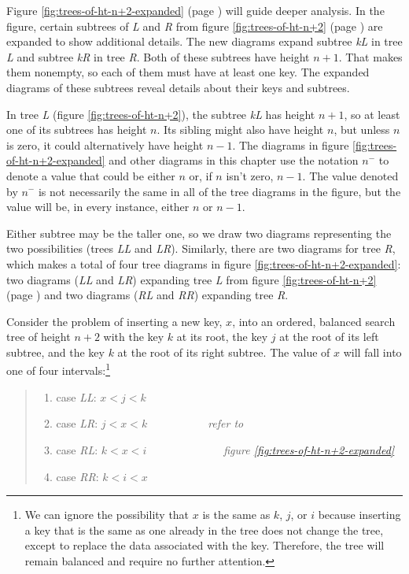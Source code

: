 Figure \ref{fig:trees-of-ht-n+2-expanded} (page \pageref{fig:trees-of-ht-n+2-expanded})
will guide deeper analysis.
In the figure, certain subtrees of \emph{L} and \emph{R} from
figure \ref{fig:trees-of-ht-n+2} (page \pageref{fig:trees-of-ht-n+2})
are expanded to show additional details.
The new diagrams expand subtree
\emph{kL} in tree \emph{L} and subtree \emph{kR} in tree \emph{R}.
Both of these subtrees have height $n+1$.
That makes them nonempty, so each of them must have at least one key.
The expanded diagrams of these subtrees
reveal details about their keys and subtrees.

In tree \emph{L} (figure \ref{fig:trees-of-ht-n+2}),
the subtree \emph{kL} has height $n+1$,
so at least one of its subtrees has height $n$.
Its sibling might also have height $n$, but unless $n$ is zero,
it could alternatively have height $n-1$.
The diagrams in figure \ref{fig:trees-of-ht-n+2-expanded}
and other diagrams in this chapter
use the notation $n^-$
to denote a value that could be either $n$
or, if $n$ isn't zero, $n-1$.
The value denoted by $n^-$ is not necessarily the same
in all of the tree diagrams in the figure,
but the value will be, in every instance,
either $n$ or $n-1$.

Either subtree may be the taller one,
so we draw two diagrams representing the two possibilities
(trees \emph{LL} and \emph{LR}).
Similarly, there are two diagrams for tree \emph{R},
which makes a total of four tree diagrams in
figure \ref{fig:trees-of-ht-n+2-expanded}:
two diagrams (\emph{LL} and \emph{LR})
expanding tree \emph{L} from 
figure \ref{fig:trees-of-ht-n+2} (page \pageref{fig:trees-of-ht-n+2})
and two diagrams (\emph{RL} and \emph{RR}) expanding tree \emph{R}.

Consider the problem of inserting a new key, $x$, into
an ordered, balanced search tree of height $n+2$ with the key $k$
at its root, the key $j$ at the root of its left subtree,
and the key $k$ at the root of its right subtree.
The value of $x$ will fall into one of four intervals:\footnote{We
can ignore the possibility that $x$ is the same as
$k$, $j$, or $i$ because
inserting a key that is the same as one already in the
tree does not change the tree,
except to replace the data associated with the key.
Therefore, the tree will remain balanced and
require no further attention.}
\label{cases:ht-n+2}\begin{quote}
\begin{enumerate}
\item case \emph{LL}: $x < j < k$
\item case \emph{LR}: $j < x < k$~~~~~~~~~~~\emph{refer to }
\item case \emph{RL}: $k < x < i$~~~~~~~~~~~~~~\emph{figure \ref{fig:trees-of-ht-n+2-expanded}}
\item case \emph{RR}: $k < i < x$
\end{enumerate}
\end{quote}

